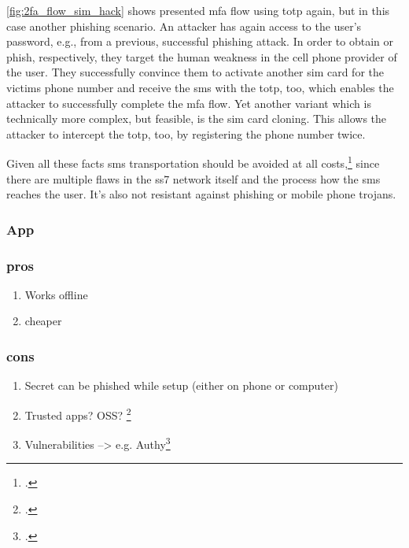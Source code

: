 \autoref{fig:2fa_flow_sim_hack} shows presented \gls{mfa} flow using \gls{totp} again, but in this case another phishing scenario. An attacker has again access to the user's password, e.g., from a previous, successful phishing attack. In order to obtain or phish, respectively, they target the human weakness in the cell phone provider of the user. They successfully convince them to activate another \gls{sim} card for the victims phone number and receive the \gls{sms} with the \gls{totp}, too, which enables the attacker to successfully complete the \gls{mfa} flow. Yet another variant which is technically more complex, but feasible, is the \gls{sim} card cloning. This allows the attacker to intercept the \gls{totp}, too, by registering the phone number twice.

\cite{FIPS198} \cite{SP80063B}

Given all these facts \gls{sms} transportation should be avoided at all costs,\footcite{JAKOBSSON20186} since there are multiple flaws in the \gls{ss7} network itself and the process how the \gls{sms} reaches the user. It's also not resistant against phishing or mobile phone trojans.


\subsubsection{App}

\subsubsection{pros}

\begin{enumerate}
	\item Works offline
	\item cheaper
\end{enumerate}

\subsubsection{cons}

\begin{enumerate}
	\item Secret can be phished while setup (either on phone or computer)
	\item Trusted apps? OSS? \footcite{eset-bypass2fa}
	\item Vulnerabilities --> e.g. Authy\footcite{sakurity-authy}
\end{enumerate}

